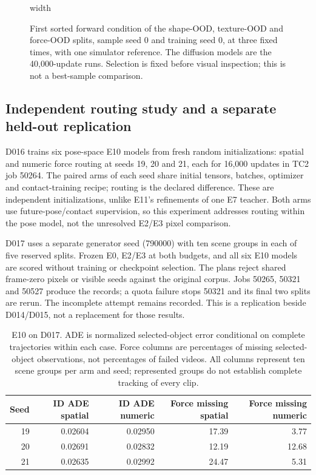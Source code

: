 \documentclass[11pt,a4paper]{article}
\begin{document}
\begin{figure}[!ht]
\centering
\pdfximage width\linewidth{report/figures/final_ood.png}\pdfrefximage\pdflastximage
\caption{First sorted forward condition of the shape-OOD, texture-OOD and force-OOD splits, sample seed 0 and training seed 0, at three fixed times, with one simulator reference. The diffusion models are the 40,000-update runs. Selection is fixed before visual inspection; this is not a best-sample comparison.}
\label{fig:ood}
\end{figure}

\clearpage

\subsection{Independent routing study and a separate held-out replication}
D016 trains six pose-space E10 models from fresh random initializations: spatial
and numeric force routing at seeds 19, 20 and 21, each for 16,000 updates in TC2 job
50264. The paired arms of each seed share initial tensors, batches, optimizer
and contact-training recipe; routing is the declared difference. These are
independent initializations, unlike E11's refinements of one E7 teacher. Both
arms use future-pose/contact supervision, so this experiment addresses routing
within the pose model, not the unresolved E2/E3 pixel comparison.

D017 uses a separate generator seed (790000) with ten scene groups in each of
five reserved splits. Frozen E0, E2/E3 at both budgets, and all six E10 models
are scored without training or checkpoint selection. The plans reject shared
frame-zero pixels or visible seeds against the original corpus. Jobs 50265,
50321 and 50527 produce the records; a quota failure stops 50321 and its final
two splits are rerun. The incomplete attempt remains recorded. This is a
replication beside D014/D015, not a replacement for those results.

\begin{table}[!ht]
\centering
\small
\begin{tabular}{rrrrr}
\hline
Seed & ID ADE spatial & ID ADE numeric & Force missing spatial & Force missing numeric \\
\hline
19 & 0.02604 & 0.02950 & 17.39 & 3.77 \\
20 & 0.02691 & 0.02832 & 12.19 & 12.68 \\
21 & 0.02635 & 0.02992 & 24.47 & 5.31 \\
\hline
\end{tabular}
\caption{E10 on D017. ADE is normalized selected-object error conditional on
complete trajectories within each case. Force columns are percentages of missing
selected-object observations, not percentages of failed videos. All columns
represent ten scene groups per arm and seed; represented groups do not establish
complete tracking of every clip.}
\label{tab:routing-replication}
\end{table}
\end{document}
